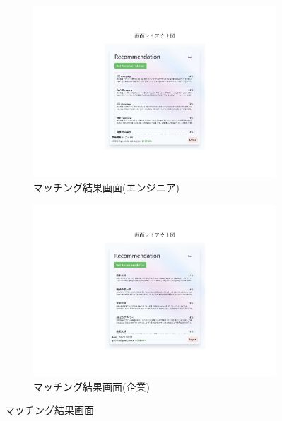 \documentclass[10pt]{ltjsarticle}
\begin{document}
\begin{figure}[H]
    \centering
    \begin{subfigure}{0.49\textwidth}
        \centering
        \includegraphics[trim=9cm 3.4cm 9cm 4.6cm, clip, width=\linewidth]{./img/recommend_engineer3.pdf}
        \caption{マッチング結果画面(エンジニア)}
        \label{fig:recommend_engineer3}
    \end{subfigure}
    \hfill
    \begin{subfigure}{0.49\textwidth}
        \centering
        \includegraphics[trim=9cm 3.4cm 9cm 4.6cm, clip, width=\linewidth]{./img/recommend_company3.pdf}
        \caption{マッチング結果画面(企業)}
        \label{fig:recommend_company3}
    \end{subfigure}
    \caption{マッチング結果画面}
    \label{fig:recommend3}
\end{figure}
\vspace{-.5cm}
\end{document}
